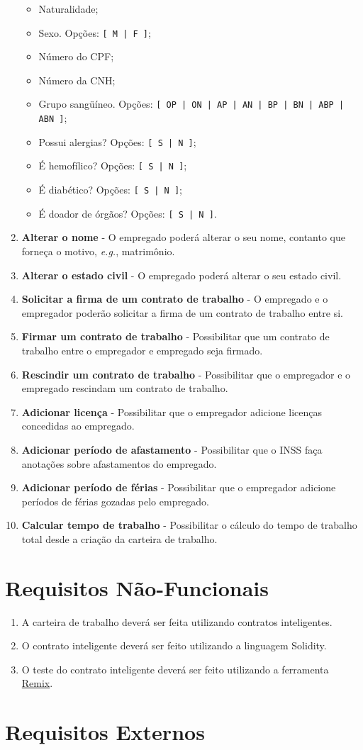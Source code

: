 \documentclass[a4paper,10pt]{article}
\begin{document}
\begin{enumerate}
\begin{itemize}
      \item Naturalidade;
      \item Sexo. Opções: \texttt{[ M | F ]};
      \item Número do CPF;
      \item Número da CNH;
      \item Grupo sangüíneo. Opções: \texttt{[ OP | ON | AP | AN | BP | BN | ABP | ABN ]};
      \item Possui alergias? Opções: \texttt{[ S | N ]};
      \item É hemofílico? Opções: \texttt{[ S | N ]};
      \item É diabético? Opções: \texttt{[ S | N ]};
      \item É doador de órgãos? Opções: \texttt{[ S | N ]}.
    \end{itemize}
  \item \textbf{Alterar o nome} - O empregado poderá alterar o seu nome, contanto que forneça o motivo, \emph{e.g.}, matrimônio.
  \item \textbf{Alterar o estado civil} - O empregado poderá alterar o seu estado civil.
  \item \textbf{Solicitar a firma de um contrato de trabalho} - O empregado e o empregador poderão solicitar a firma de um contrato de trabalho entre si.
  \item \textbf{Firmar um contrato de trabalho} - Possibilitar que um contrato de trabalho entre o empregador e empregado seja firmado.
  \item \textbf{Rescindir um contrato de trabalho} - Possibilitar que o empregador e o empregado rescindam um contrato de trabalho.
  \item \textbf{Adicionar licença} - Possibilitar que o empregador adicione licenças concedidas ao empregado. 
  \item \textbf{Adicionar período de afastamento} - Possibilitar que o INSS faça anotações sobre afastamentos do empregado.
  \item \textbf{Adicionar período de férias} - Possibilitar que o empregador adicione períodos de férias gozadas pelo empregado.
  \item \textbf{Calcular tempo de trabalho} - Possibilitar o cálculo do tempo de trabalho total desde a criação da carteira de trabalho.
\end{enumerate}

\section{Requisitos Não-Funcionais}
\begin{enumerate}
  \item A carteira de trabalho deverá ser feita utilizando contratos inteligentes.
  \item O contrato inteligente deverá ser feito utilizando a linguagem Solidity.
  \item O teste do contrato inteligente deverá ser feito utilizando a ferramenta \href{https://remix.ethereum.org/}{Remix}.
\end{enumerate}
\section{Requisitos Externos}
\end{document}
